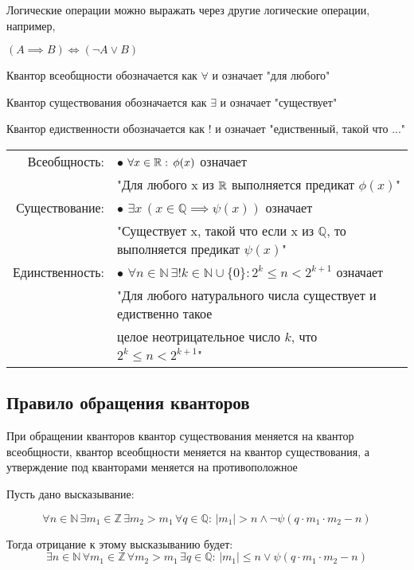 \nt
{
    Логические операции можно выражать через другие логические операции, например,

    $ (A \implies B) \iff (\lnot A \vee B) $
}

{
Квантор всеобщности обозначается как $ \forall $ и означает "для любого"

Квантор существования обозначается как $ \exists $ и означает "существует"

Квантор едиственности обозначается как $ ! $ и означает "едиственный, такой что ..."
}

\mcex{}
{
\begin{tabular}{rl}
    Всеобщность:    & $\bullet$ $ \forall x \in \Rset: \, \phi(x) $ означает \\
                    & "Для любого x из $\Rset $ выполняется предикат $ \phi(x) $" \\
    Существование:  & $\bullet$ $ \exists x \, (x \in \mathbb{Q} \implies \psi(x)) $ означает \\
                    & "Существует x, такой что если x из $\mathbb{Q} $, то выполняется предикат $ \psi(x) $" \\
    Единственность: & $\bullet$ $ \forall n \in \mathbb{N} \, \exists! k \in \mathbb{N} \cup \{ 0 \}: 2^k \le n < 2^{k + 1} $ означает \\
                    & "Для любого натурального числа существует и едиственно такое \\
                    & целое неотрицательное число $ k $, что $ 2^k \le n < 2^{k + 1} $" \\
\end{tabular}
}



\subsection{Правило обращения кванторов}

{
    При обращении кванторов квантор существования
    меняется на квантор всеобщности, квантор всеобщности
    меняется на квантор существования, а утверждение под
    кванторами меняется на противоположное
}

\mcex{}
{
    Пусть дано высказывание:

    \[
    \forall n \in \mathbb{N} \,
    \exists m_1 \in \mathbb{Z} \,
    \exists m_2 > m_1 \,
    \forall q \in \mathbb{Q}: \,
        | m_1 | > n \wedge \lnot
        \psi(q \cdot m_1 \cdot m_2 - n)
    \]

    Тогда отрицание к этому высказыванию будет:
    \[
    \exists n \in \mathbb{N} \,
    \forall m_1 \in \mathbb{Z} \,
    \forall m_2 > m_1 \,
    \exists q \in \mathbb{Q}: \,
        | m_1 | \le n \vee
        \psi(q \cdot m_1 \cdot m_2 - n)
    \]
}

